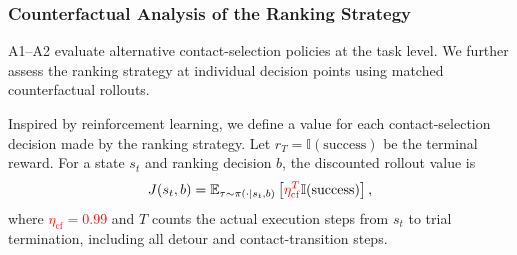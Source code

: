 \noindent

\begin{table}[t]
\centering
\caption{CSO contact-guidance performance.}
\label{tab:cso_contact_guidance}
\footnotesize
{}
\end{table}

\subsubsection{Counterfactual Analysis of the Ranking Strategy}
\label{sec:ranking_ablation}
A1--A2 evaluate alternative contact-selection policies at the task level. We further assess the ranking strategy at individual decision points using matched counterfactual rollouts.

Inspired by reinforcement learning, we define a value for each contact-selection decision made by the ranking strategy. Let $r_T=\mathbb{I}(\mathrm{success})$ be the terminal reward. For a state $s_t$ and ranking decision $b$, the discounted rollout value is
\begin{equation}
J(s_t,b)=\mathbb{E}_{\tau\sim\pi(\cdot\mid s_t,b)}
\left[\textcolor{red}{\eta_{\mathrm{cf}}^{T}}\mathbb{I}(\mathrm{success})\right],
\end{equation}
where \textcolor{red}{$\eta_{\mathrm{cf}}=0.99$} and $T$ counts the actual execution steps from $s_t$ to trial termination, including all detour and contact-transition steps\textcolor{red}{}.

